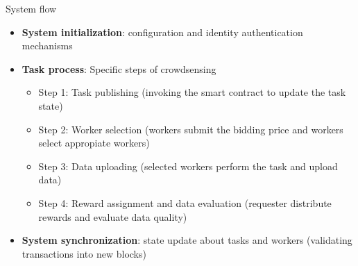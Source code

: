 
\begin{frame}{System flow}
  \begin{itemize}
    \item \textbf{System initialization}: configuration and identity authentication mechanisms
    \item \textbf{Task process}: Specific steps of crowdsensing
          \begin{itemize}
            \item Step 1: \alert{Task publishing} (invoking the smart contract to update the task state)
            \item Step 2: \alert{Worker selection} (workers submit the bidding price and workers select appropiate workers)
            \item Step 3: \alert{Data uploading} (selected workers perform the task and upload data)
            \item Step 4: \alert{Reward assignment and data evaluation} (requester distribute rewards and evaluate data quality)
          \end{itemize}
     \item \textbf{System synchronization}: state update about tasks and workers (validating transactions into new blocks)
  \end{itemize}
\end{frame}
